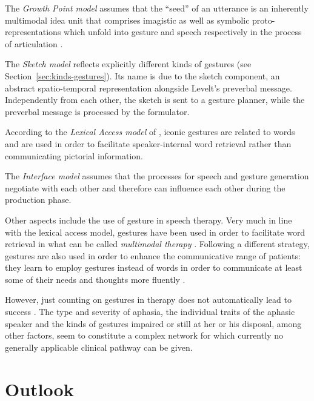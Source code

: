 \documentclass[output=paper,biblatex,babelshorthands,newtxmath,draftmode,colorlinks,citecolor=brown]{langscibook}
\begin{document}
The \emph{Growth Point model} \citep{McNeill:Duncan:2000} assumes that the \enquote{seed} of an utterance is an inherently multimodal idea unit that comprises imagistic as well as symbolic proto-representations which unfold into gesture and speech respectively in the process of articulation \citetext{see also \citealt{Roepke:2011} on the growth point's entrenchment in contexts and frames}.

The \emph{Sketch model} \citep{de:Ruiter:2000} reflects explicitly different kinds of gestures (see Section~\ref{sec:kinds-gestures}). 
%
Its name is due to the sketch component, an abstract spatio-temporal representation alongside Levelt's preverbal message. 
%
Independently from each other, the sketch is sent to a gesture planner, while the preverbal message is processed by the formulator.

\largerpage
According to the \emph{Lexical Access model} of \citet{Krauss:Chen:Gottesmann:2000}, iconic gestures are related to words and are used in order to facilitate speaker-internal word retrieval rather than communicating pictorial information.

The \emph{Interface model} \citep{Kita:Ozyurek:2003} assumes that the processes for speech and gesture generation negotiate with each other and therefore can influence each other during the production phase.

Other aspects include the use of gesture in speech therapy. 
%
Very much in line with the lexical access model, gestures have been used in order to facilitate word retrieval in what can be called \emph{multimodal therapy} \citep{Rose:2006}.
%
Following a different strategy, gestures are also used in order to enhance the communicative range of patients: they learn to employ gestures instead of words in order to communicate at least some of their needs and thoughts more fluently \citep{Cubelli:Trentini:Montagna:1991,Caute:et:al:2013}.

However, just counting on gestures in therapy does not automatically lead to success \citep{Auer:Bauer:2011}. 
%
The type and severity of aphasia, the individual traits of the aphasic speaker and the kinds of gestures impaired or still at her or his disposal, among other factors, seem to constitute a complex network for which currently no generally applicable clinical pathway can be given.




\section{Outlook}
\label{sec:outlook}
\end{document}
